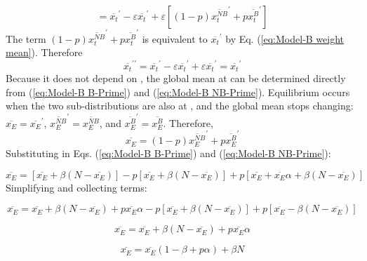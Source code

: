 \begin{equation}
=\overline{x_{t}}^{\prime}-\varepsilon\overline{x_{t}}^{\prime}+\varepsilon\left[(1-p)\overline{x_{t}^{NB}}^{\prime}+p\overline{x_{t}^{B}}^{\prime}\right]
\end{equation}
The term $(1-p)\overline{x_{t}^{NB}}^{\prime}+p\overline{x_{t}^{B}}^{\prime}$
is equivalent to $\overline{x_{t}}^{\prime}$ by Eq. (\ref{eq:Model-B weight mean}).
Therefore
\begin{equation}
\overline{x_{t}}^{\prime\prime}=\overline{x_{t}}^{\prime}-\varepsilon\overline{x_{t}}^{\prime}+\varepsilon\overline{x_{t}}^{\prime}=\overline{x_{t}}^{\prime}
\end{equation}
Because it does not depend on , the global mean at 
can be determined directly from (\ref{eq:Model-B B-Prime}) and (\ref{eq:Model-B NB-Prime}).
Equilibrium occurs when the two sub-distributions are also at ,
and the global mean stops changing: $\overline{x_{E}}=\overline{x_{E}}^{\prime}$,
$\overline{x_{E}^{NB}}^{\prime}=\overline{x_{E}^{NB}}$, and $\overline{x_{E}^{B}}^{\prime}=\overline{x_{E}^{B}}$.
Therefore,
\begin{equation}
\overline{x_{E}}=(1-p)\overline{x_{E}^{NB}}^{\prime}+p\overline{x_{E}^{B}}^{\prime}
\end{equation}
Substituting in Eqs. (\ref{eq:Model-B B-Prime}) and (\ref{eq:Model-B NB-Prime}):

\begin{equation}
\overline{x_{E}}=[\overline{x_{E}}+\beta(N-\overline{x_{E}})]-p[\overline{x_{E}}+\beta(N-\overline{x_{E}})]+p[\overline{x_{E}}+\overline{x_{E}}\alpha+\beta(N-\overline{x_{E}})]
\end{equation}
Simplifying and collecting terms:

\begin{equation}
\overline{x_{E}}=\overline{x_{E}}+\beta(N-\overline{x_{E}})+p\overline{x_{E}}\alpha-p[\overline{x_{E}}+\beta(N-\overline{x_{E}})]+p[\overline{x_{E}}-\beta(N-\overline{x_{E}})]
\end{equation}

\begin{equation}
\overline{x_{E}}=\overline{x_{E}}+\beta(N-\overline{x_{E}})+p\overline{x_{E}}\alpha
\end{equation}

\begin{equation}
\overline{x_{E}}=\overline{x_{E}}(1-\beta+p\alpha)+\beta N
\end{equation}

